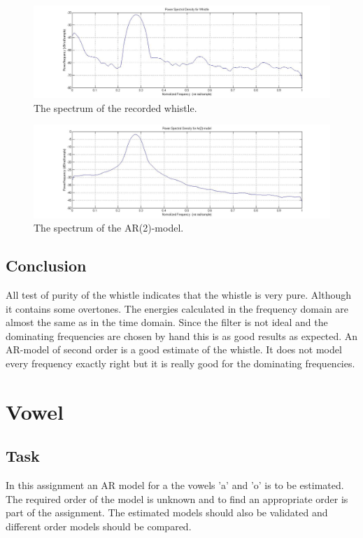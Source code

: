 \documentclass[12pt]{article}
\begin{document}
\begin{figure}[H]
\centering
\includegraphics[width=14cm]{psdwhis.jpg}
\caption{The spectrum of the recorded whistle.\label{psdwhis}}
\end{figure}

\begin{figure}[H]
\centering
\includegraphics[width=14cm]{psdar2.jpg}
\caption{The spectrum of the AR(2)-model.\label{psdar2}}
\end{figure}


\subsection{Conclusion}
All test of purity of the whistle indicates that the whistle is very pure. Although it contains some overtones. The energies calculated in the frequency domain are almost the same as in the time domain. Since the filter is not ideal and the dominating frequencies are chosen by hand this is as good results as expected. An AR-model of second order is a good estimate of the whistle. It does not model every frequency exactly right but it is really good for the dominating frequencies. 

\clearpage
\section{Vowel}

\subsection{Task}
In this assignment an AR model for a the vowels 'a' and 'o' is to be estimated.
The required order of the model is unknown and to find an appropriate order is part of the assignment.
The estimated models should also be validated and different order models should be compared.
\end{document}
